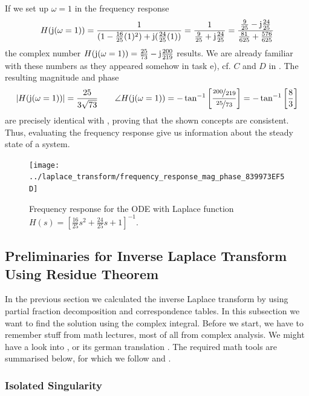 \documentclass[11pt,a4paper,DIV=12]{scrartcl}
\begin{document}
If we set up $\omega=1$ in the frequency response
\begin{align}
H(\im(\omega=1))
= \frac{1}{ (1 -\frac{16}{25} (1)^2) + \im (\frac{24}{25} (1))}
= \frac{1}{ \frac{9}{25} + \im \frac{24}{25}}
= \frac{\frac{9}{25} - \im \frac{24}{25}}{ \frac{81}{625} + \frac{576}{625}}
\end{align}
the complex number $H(\im(\omega=1)) = \frac{25}{73} - \im \frac{200}{219}$ results.
%
We are already familiar with these numbers as they appeared somehow in task e), cf.
$C$ and $D$ in .
%
The resulting magnitude and phase
\begin{equation}
|H(\im(\omega=1))| = \frac{25}{3 \sqrt{73}}
\qquad
\angle H(\im(\omega=1)) = -\tan^{-1}
\left[\frac{\nicefrac{200}{219}}{\nicefrac{25}{73}}\right]
= -\tan^{-1}\left[\frac{8}{3}\right]
\end{equation}
are precisely identical with ,
proving that the shown concepts are consistent.
%
Thus, evaluating the frequency response give us information about the steady
state of a system.
%
\begin{figure}[h!]
\centering
\texttt{[image: ../laplace\_transform/frequency\_response\_mag\_phase\_839973EF5D]}
\caption{Frequency response for the ODE with Laplace function
$H(s) = \left[ \frac{16}{25} s^2 + \frac{24}{25} s + 1 \right]^{-1}$.}
\label{fig:frequency_response_mag_phase}
\end{figure}
\cleardoublepage
\subsection{Preliminaries for Inverse Laplace Transform Using Residue Theorem}
\label{sec:PrelimResidueTheorem}
%
%
In the previous section we calculated the inverse Laplace transform by using partial fraction decomposition and correspondence tables. In this subsection we want to find the solution using the complex integral.
Before we start, we have to remember stuff from math lectures, most of all from complex analysis.
%
We might have a look into \cite{Strang2007}, or its german translation \cite{Strang2010}.
%
The required math tools are summarised below, for which we follow \cite{Fritzsche2019} and \cite{UlrichWeber2017}.

\subsubsection{Isolated Singularity}
\end{document}

